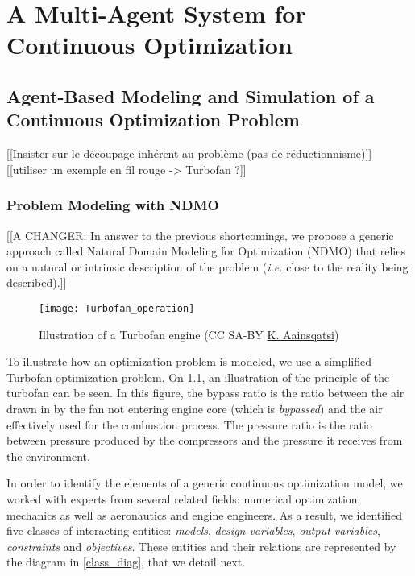 \part{A Multi-Agent System for Continuous Optimization}

\chapter{Agent-Based Modeling and Simulation of a Continuous Optimization Problem}

[[Insister sur le découpage inhérent au problème (pas de réductionnisme)]]
[[utiliser un exemple en fil rouge -> Turbofan ?]]

\section{Problem Modeling with NDMO}\label{modeling}

[[A CHANGER: In answer to the previous shortcomings, we propose a generic approach called Natural Domain Modeling for Optimization (NDMO) that relies on a natural or intrinsic description of the problem (\textit{i.e.} close to the reality being described).]]

\begin{figure}[]
	\centering
	\texttt{[image: Turbofan\_operation]}
	\caption{Illustration of a Turbofan engine (CC SA-BY  \href{http://en.wikipedia.org/wiki/File:Turbofan_operation.svg}{K. Aainsqatsi})}
	\label{turbofan_illu}
\end{figure}

To illustrate how an optimization problem is modeled, we use a simplified Turbofan optimization problem. On \figurename{} \ref{turbofan_illu}, an illustration of the principle of the turbofan can be seen. In this figure, the bypass ratio is the ratio between the air drawn in by the fan not entering engine core (which is \emph{bypassed}) and the air effectively used for the combustion process. The pressure ratio is the ratio between pressure produced by the compressors and the pressure it receives from the environment.

In order to identify the elements of a generic continuous optimization model, we worked with experts from several related fields: numerical optimization, mechanics as well as aeronautics and engine engineers. As a result, we identified five classes of interacting entities: \emph{models}, \emph{design variables}, \emph{output variables}, \emph{constraints} and \emph{objectives}. These entities and their relations are represented by the diagram in \figurename{} \ref{class_diag}, that we detail next.

